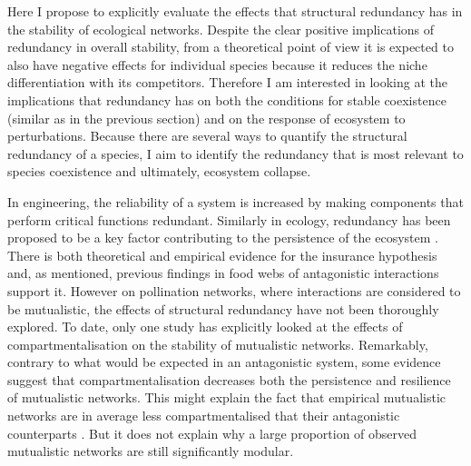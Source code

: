 \documentclass[a4paper]{article}
\begin{document}
Here I propose to explicitly evaluate the effects that structural redundancy has in the stability of ecological networks.
Despite the clear positive implications of redundancy in overall stability, from a theoretical point of view it is expected to also have negative effects for individual species because it reduces the niche differentiation with its competitors.
Therefore I am interested in looking at the implications that redundancy has on both the conditions for stable coexistence (similar as in the previous section) and on the response of ecosystem to perturbations.
Because there are several ways to quantify the structural redundancy of a species, I aim to identify the redundancy that is most relevant to species coexistence and ultimately, ecosystem collapse.

In engineering, the reliability of a system is increased by making components that perform critical functions redundant.
Similarly in ecology, redundancy has been proposed to be a key factor contributing to the persistence of the ecosystem \autocite{Naeem1997,Naeem1998}.
There is both theoretical \autocite{Yachi1999} and empirical \autocite{Valone2008} evidence for the insurance hypothesis and, as mentioned, previous findings in food webs of antagonistic interactions support it.
However on pollination networks, where interactions are considered to be mutualistic, the effects of structural redundancy have not been thoroughly explored.
To date, only one study \autocite{Thebault2010} has explicitly looked at the effects of compartmentalisation on the stability of mutualistic networks.
Remarkably, contrary to what would be expected in an antagonistic system, some evidence suggest that compartmentalisation decreases both the persistence and resilience of mutualistic networks.
This might explain the fact that empirical mutualistic networks are in average less compartmentalised that their antagonistic counterparts \autocite{Thebault2010}.
But it does not explain why a large proportion of observed mutualistic networks are still significantly modular.
\end{document}
